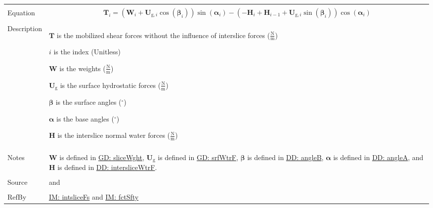 \documentclass[12pt]{article}
\begin{document}
\begin{minipage}{\textwidth}
\begin{tabular}{>{\raggedright}p{}>{\raggedright\arraybackslash}p{}}
\\ \midrule \\
Equation & \begin{displaymath}
           {\mathbf{T}}_{i}=\left({\mathbf{W}}_{i}+{\mathbf{U}_{\text{g},i}} \cos\left({\mathbf{β}}_{i}\right)\right) \sin\left({\mathbf{α}}_{i}\right)-\left(-{\mathbf{H}}_{i}+{\mathbf{H}}_{i-1}+{\mathbf{U}_{\text{g},i}} \sin\left({\mathbf{β}}_{i}\right)\right) \cos\left({\mathbf{α}}_{i}\right)
           \end{displaymath}
\\ \midrule \\
Description & \begin{symbDescription}
              \item{$\mathbf{T}$ is the mobilized shear forces without the influence of interslice forces ($\frac{\text{N}}{\text{m}}$)}
              \item{$i$ is the index (Unitless)}
              \item{$\mathbf{W}$ is the weights ($\frac{\text{N}}{\text{m}}$)}
              \item{${\mathbf{U}_{\text{g}}}$ is the surface hydrostatic forces ($\frac{\text{N}}{\text{m}}$)}
              \item{$\mathbf{β}$ is the surface angles (${}^{\circ}$)}
              \item{$\mathbf{α}$ is the base angles (${}^{\circ}$)}
              \item{$\mathbf{H}$ is the interslice normal water forces ($\frac{\text{N}}{\text{m}}$)}
              \end{symbDescription}
\\ \midrule \\
Notes & $\mathbf{W}$ is defined in \hyperref[GD:sliceWght]{GD: sliceWght}, ${\mathbf{U}_{\text{g}}}$ is defined in \hyperref[GD:srfWtrF]{GD: srfWtrF}, $\mathbf{β}$ is defined in \hyperref[DD:angleB]{DD: angleB}, $\mathbf{α}$ is defined in \hyperref[DD:angleA]{DD: angleA}, and $\mathbf{H}$ is defined in \hyperref[DD:intersliceWtrF]{DD: intersliceWtrF}.
        
\\ \midrule \\
Source & \cite{chen2005} and \cite{karchewski2012}
         
\\ \midrule \\
RefBy & \hyperref[IM:intsliceFs]{IM: intsliceFs} and \hyperref[IM:fctSfty]{IM: fctSfty}
        
\\ \bottomrule
\end{tabular}
\end{minipage}
\end{document}

